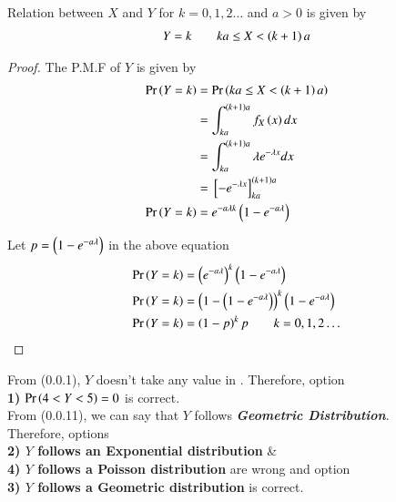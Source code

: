 \documentclass[journal,12pt,twocolumn]{IEEEtran}
\begin{document}
Relation between $X$ and $Y$ for $k=0,1,2\ldots$ and $a>0$ is given by
\begin{align}
    Y=k \qquad ka\leq X < \left(k+1\right)a
\end{align}

\begin{proof}
The P.M.F of $Y$ is given by
\begin{align}
    \Pr\left(Y=k\right) &= \Pr\left(ka\leq X < \left(k+1\right)a\right)\\
    &= \int_{ka}^{\left(k+1\right)a}f_X\left(x\right)dx\\
    &= \int_{ka}^{\left(k+1\right)a}\lambda e^{-\lambda x}dx\\
    &= {}\left[-e^{-\lambda x}\right]_{ka}^{\left(k+1\right)a}\\
    \Pr\left(Y=k\right) &= e^{-a\lambda k}\left(1 - e^{-a\lambda}\right)
\end{align}

Let $p=\left(1-e^{-a\lambda}\right)$ in the above equation
\begin{align}
    \Pr\left(Y=k\right) &= \left(e^{-a\lambda}\right)^k\left(1-e^{-a\lambda}\right)\\
    \Pr\left(Y=k\right) &= \left(1-\left(1-e^{-a\lambda}\right)\right)^k\left(1-e^{-a\lambda}\right)\\
    \Pr\left(Y=k\right) &= \left(1-p\right)^kp \qquad k=0,1,2\ldots
\end{align}
\end{proof}

From (0.0.1), $Y$ doesn't take any value in .
Therefore, option \\ \textbf{1)} $\Pr\left(4<Y<5\right)=0$ is correct.\\

From (0.0.11), we can say that $Y$ follows \textit{\textbf{Geometric Distribution}}.\\
Therefore, options\\ \textbf{2) $Y$ follows an Exponential distribution} \& \\ \textbf{4) $Y$ follows a Poisson distribution} are wrong and option \\ \textbf{3) $Y$ follows a Geometric distribution} is correct.
\end{document}
